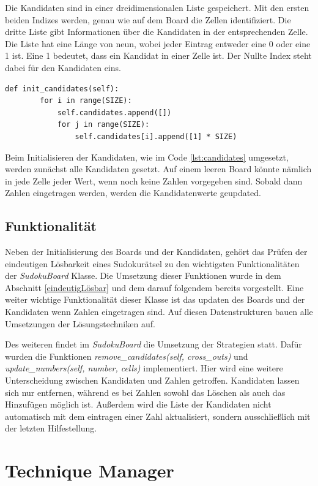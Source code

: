 Die Kandidaten sind in einer dreidimensionalen Liste gespeichert. Mit den ersten beiden Indizes werden, genau wie auf dem Board die Zellen identifiziert. Die dritte Liste gibt Informationen über die Kandidaten in der entsprechenden Zelle. Die Liste hat eine Länge von neun, wobei jeder Eintrag entweder eine 0 oder eine 1 ist. Eine 1 bedeutet, dass ein Kandidat in einer Zelle ist. Der Nullte Index steht dabei für den Kandidaten eins.

\begin{lstlisting}[caption={Initalisierung der Kandidaten}, label={lst:candidates}]
	def init_candidates(self):
		for i in range(SIZE):
			self.candidates.append([])
			for j in range(SIZE):
				self.candidates[i].append([1] * SIZE)
\end{lstlisting}

Beim Initialisieren der Kandidaten, wie im Code \ref{lst:candidates} umgesetzt, werden zunächst alle Kandidaten gesetzt. Auf einem leeren Board könnte nämlich in jede Zelle jeder Wert, wenn noch keine Zahlen vorgegeben sind. Sobald dann Zahlen eingetragen werden, werden die Kandidatenwerte geupdated.

\subsection{Funktionalität}
Neben der Initialisierung des Boards und der Kandidaten, gehört das Prüfen der eindeutigen Lösbarkeit eines Sudokurätsel zu den wichtigsten Funktionalitäten der \textit{SudokuBoard} Klasse. Die Umsetzung dieser Funktionen wurde in dem Abschnitt \ref{eindeutigLösbar} und dem darauf folgendem bereits vorgestellt. Eine weiter wichtige Funktionalität dieser Klasse ist das updaten des Boards und der Kandidaten wenn Zahlen eingetragen sind. Auf diesen Datenstrukturen bauen alle Umsetzungen der Lösungstechniken auf. 

Des weiteren findet im \textit{SudokuBoard} die Umsetzung der Strategien statt. Dafür wurden die Funktionen \textit{remove\_candidates(self, cross\_outs)} und \textit{update\_numbers(self, number, cells)} implementiert. Hier wird eine weitere Unterscheidung zwischen Kandidaten und Zahlen getroffen. Kandidaten lassen sich nur entfernen, während es bei Zahlen sowohl das Löschen als auch das Hinzufügen möglich ist. Außerdem wird die Liste der Kandidaten nicht automatisch mit dem eintragen einer Zahl aktualisiert, sondern ausschließlich mit der letzten Hilfestellung.


\section{Technique Manager}

